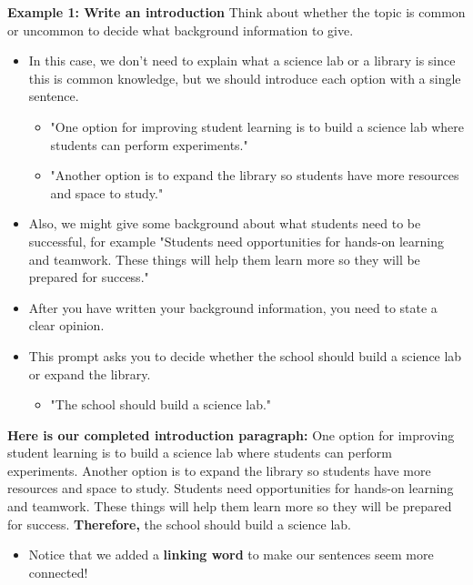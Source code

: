 \documentclass[12pt]{article}
\begin{document}
\begin{tcolorbox}[colframe=black!60, colback=white, 
coltitle=black, colbacktitle=black!15, fonttitle=\bfseries\Large, 
title=Examples, halign title=center, left=10pt, right=10pt, top=10pt, bottom=15pt]

\textbf{Example 1: Write an introduction}
Think about whether the topic is common or uncommon to decide what background information to give.
    \begin{itemize}
        \item In this case, we don't need to explain what a science lab or a library is since this is common knowledge, but we should introduce each option with a single sentence.
        \begin{itemize}
            \item "One option for improving student learning is to build a science lab where students can perform experiments."
            \item "Another option is to expand the library so students have more resources and space to study."
        \end{itemize}
        \item Also, we might give some background about what students need to be successful, for example "Students need opportunities for hands-on learning and teamwork. These things will help them learn more so they will be prepared for success."
        \end{itemize}
    
\begin{itemize}
    \item After you have written your background information, you need to state a clear opinion.
\end{itemize}
\begin{itemize}
    \item This prompt asks you to decide whether the school should build a science lab or expand the library.
    \begin{itemize}
        \item "The school should build a science lab."
    \end{itemize}
\end{itemize}


\textbf{Here is  our completed introduction paragraph:} One option for improving student learning is to build a science lab where students can perform experiments. Another option is to expand the library so students have more resources and space to study. Students need opportunities for hands-on learning and teamwork. These things will help them learn more so they will be prepared for success. \textbf{Therefore,} the school should build a science lab.
\begin{itemize}
    \item Notice that we added a \textbf{linking word} to make our sentences seem more connected!
\end{itemize}







     \end{tcolorbox}
\end{document}
